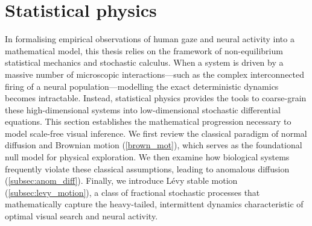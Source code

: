 \section{Statistical physics}\label{sec:stat_phys}
In formalising empirical observations of human gaze and neural activity into a mathematical model, this thesis relies on the framework of non-equilibrium statistical mechanics and stochastic calculus. When a system is driven by a massive number of microscopic interactions—such as the complex interconnected firing of a neural population—modelling the exact deterministic dynamics becomes intractable. Instead, statistical physics provides the tools to coarse-grain these high-dimensional systems into low-dimensional stochastic differential equations. This section establishes the mathematical progression necessary to model scale-free visual inference. We first review the classical paradigm of normal diffusion and Brownian motion (\cref{brown_mot}), which serves as the foundational null model for physical exploration. We then examine how biological systems frequently violate these classical assumptions, leading to anomalous diffusion (\cref{subsec:anom_diff}). Finally, we introduce Lévy stable motion (\cref{subsec:levy_motion}), a class of fractional stochastic processes that mathematically capture the heavy-tailed, intermittent dynamics characteristic of optimal visual search and neural activity.
